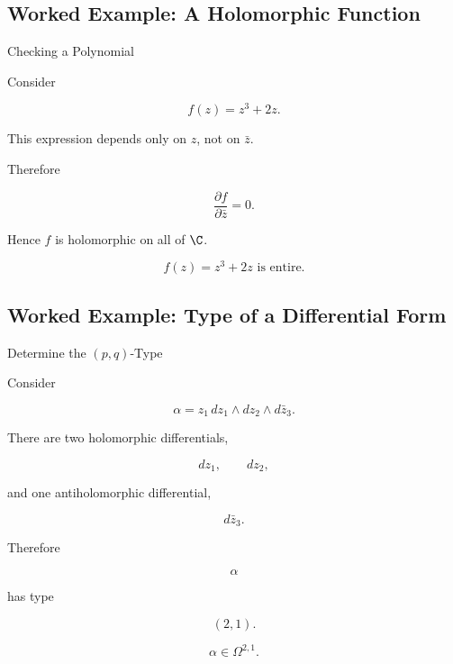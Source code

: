 \subsection{Worked Example: A Holomorphic Function}
\label{subsec:worked-holomorphic-function}

\begin{workedexamplebox}{Checking a Polynomial}

Consider

\[
f(z)=z^3+2z.
\]

This expression depends only on \(z\), not on \(\bar z\).

Therefore

\[
\frac{\partial f}{\partial\bar z}=0.
\]

Hence \(f\) is holomorphic on all of \(\C\).

\begin{answerbox}
\[
\boxed{
f(z)=z^3+2z
\text{ is entire.}
}
\]
\end{answerbox}
\end{workedexamplebox}

\subsection{Worked Example: Type of a Differential Form}
\label{subsec:worked-pq-form}

\begin{workedexamplebox}{Determine the \((p,q)\)-Type}

Consider

\[
\alpha
=
z_1\,dz_1\wedge dz_2\wedge d\bar z_3.
\]

There are two holomorphic differentials,

\[
dz_1,
\qquad
dz_2,
\]

and one antiholomorphic differential,

\[
d\bar z_3.
\]

Therefore

\[
\alpha
\]

has type

\[
(2,1).
\]

\begin{answerbox}
\[
\boxed{
\alpha\in\Omega^{2,1}.
}
\]
\end{answerbox}
\end{workedexamplebox}

